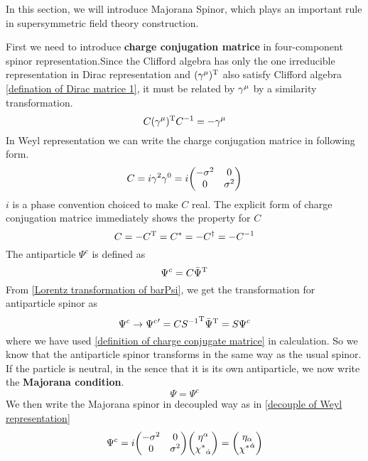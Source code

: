 In this section, we will introduce Majorana Spinor, which plays an important rule in supersymmetric field theory construction.

First we need to introduce \textbf{charge conjugation matrice} in four-component spinor representation.Since the Clifford algebra has only the one irreducible representation in Dirac representation and $(\gamma^{\mu})^{\text{T}}$ also satisfy Clifford algebra \eqref{defination of Dirac matrice 1}, it must be related by $\gamma^{\mu}$ by a similarity transformation. 
\begin{equation}\label{definition of charge conjugate matrice}
  C (\gamma^{\mu})^{\text{T}} C^{-1} = -\gamma^{\mu}
\end{equation}
In Weyl representation we can write the charge conjugation matrice in following form.
\begin{equation}
C = i \g^2\g^0 
= i\mqty(-\s^{2} & 0    \\
          0      & \s^{2})
\end{equation}
$i$ is a phase convention choiced to make $C$ real. The explicit form of charge conjugation matrice immediately shows the property for $C$
\begin{equation}
C = - C^{\text{T}} = C^{*} = -C^{\dagger} = -C^{-1}
\end{equation}
The antiparticle $\Psi^{c}$ is defined as
\begin{equation}
\Psi^{c} = C \bar{\Psi}^{\text{T}}
\end{equation}
From \eqref{Lorentz transformation of barPsi}, we get the transformation for antiparticle spinor as
\begin{equation}
\Psi^{c} \rightarrow {\Psi^{c}}' = C {S^{-1}}^{\text{T}} {\bar\Psi}^{\text{T}}
 =S \Psi^{c}
\end{equation}
where we have used \eqref{definition of charge conjugate matrice} in calculation. So we know that the antiparticle spinor transforms in the same way as the usual spinor. If the particle is neutral, in the sence that it is its own antiparticle, we now write the \textbf{Majorana condition}.
\begin{equation}\label{Majorana condition}
 \Psi = \Psi^{c}
\end{equation}
We then write the Majorana spinor in decoupled way as in \eqref{decouple of Weyl representation} 
\begin{equation}
\Psi^{c} = i\mqty(-\s^{2} & 0    \\
           0      & \s^{2})
           \mqty(\h^{\a}  \\  \lc_{\doa})
         = \mqty(\h_{\a} \\ \lc^{\doa})
\end{equation}
